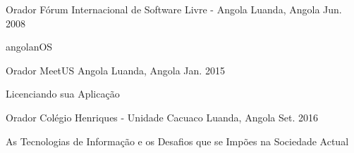 


\begin{cventries}


\cventry
{Orador} %
{Fórum Internacional de Software Livre - Angola} %
{Luanda, Angola} %
{Jun. 2008} %
{ %
\begin{cvitems}
\item {angolanOS}
\end{cvitems}
}



\cventry
{Orador} %
{MeetUS Angola} %
{Luanda, Angola} %
{Jan. 2015} %
{ %
\begin{cvitems}
\item {Licenciando sua Aplicação}
\end{cvitems}
}


\cventry
{Orador} %
{Colégio Henriques - Unidade Cacuaco} %
{Luanda, Angola} %
{Set. 2016} %
{ %
\begin{cvitems}
\item {As Tecnologias de Informação e os Desafios que se Impões na Sociedade Actual}
\end{cvitems}
}



\end{cventries}
